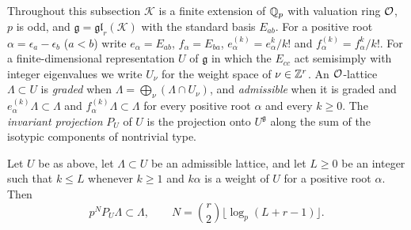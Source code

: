 Throughout this subsection $\mathcal K$ is a finite extension of $\mathbb Q_p$ with valuation ring $\mathcal O$, $p$ is odd, and $\mathfrak g=\mathfrak{gl}_r(\mathcal K)$ with the standard basis $E_{ab}$. For a positive root $\alpha=\epsilon_a-\epsilon_b$ ($a<b$) write $e_\alpha=E_{ab}$, $f_\alpha=E_{ba}$, $e_\alpha^{(k)}=e_\alpha^k/k!$ and $f_\alpha^{(k)}=f_\alpha^k/k!$. For a finite-dimensional representation $U$ of $\mathfrak g$ in which the $E_{cc}$ act semisimply with integer eigenvalues we write $U_\nu$ for the weight space of $\nu\in\mathbb Z^r$. An $\mathcal O$-lattice $\Lambda\subset U$ is \emph{graded} when $\Lambda=\bigoplus_\nu(\Lambda\cap U_\nu)$, and \emph{admissible} when it is graded and $e_\alpha^{(k)}\Lambda\subset\Lambda$ and $f_\alpha^{(k)}\Lambda\subset\Lambda$ for every positive root $\alpha$ and every $k\ge0$. The \emph{invariant projection} $P_U$ of $U$ is the projection onto $U^{\mathfrak g}$ along the sum of the isotypic components of nontrivial type.

\begin{lemma}\label{w1:lem:invproj}
Let $U$ be as above, let $\Lambda\subset U$ be an admissible lattice, and let $L\ge0$ be an integer such that $k\le L$ whenever $k\ge1$ and $k\alpha$ is a weight of $U$ for a positive root $\alpha$. Then
\[
p^{N}P_U\Lambda\subset\Lambda,\qquad N=\binom r2\big\lfloor\log_p(L+r-1)\big\rfloor .
\]
\end{lemma}

